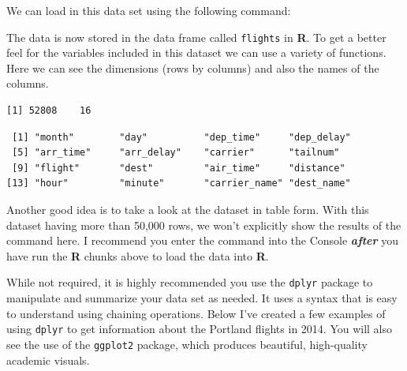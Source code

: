 \documentclass[12pt,twoside]{dukestatscithesis}
\theoremstyle{definition}
\theoremstyle{definition}
\theoremstyle{definition}
\theoremstyle{remark}
\begin{document}
We can load in this data set using the following command:
\begin{Shaded}
\begin{Highlighting}[]
\StringTok{ }\NormalTok{(}\NormalTok{)}
\end{Highlighting}
\end{Shaded}
The data is now stored in the data frame called \texttt{flights} in
\textbf{R}. To get a better feel for the variables included in this
dataset we can use a variety of functions. Here we can see the
dimensions (rows by columns) and also the names of the columns.
\begin{Shaded}
\begin{Highlighting}[]
\end{Highlighting}
\end{Shaded}
\begin{verbatim}
[1] 52808    16
\end{verbatim}
\begin{Shaded}
\begin{Highlighting}[]
\end{Highlighting}
\end{Shaded}
\begin{verbatim}
 [1] "month"        "day"          "dep_time"     "dep_delay"   
 [5] "arr_time"     "arr_delay"    "carrier"      "tailnum"     
 [9] "flight"       "dest"         "air_time"     "distance"    
[13] "hour"         "minute"       "carrier_name" "dest_name"   
\end{verbatim}
Another good idea is to take a look at the dataset in table form. With
this dataset having more than 50,000 rows, we won't explicitly show the
results of the command here. I recommend you enter the command into the
Console \textbf{\emph{after}} you have run the \textbf{R} chunks above
to load the data into \textbf{R}.
\begin{Shaded}
\begin{Highlighting}[]
\end{Highlighting}
\end{Shaded}
While not required, it is highly recommended you use the \texttt{dplyr}
package to manipulate and summarize your data set as needed. It uses a
syntax that is easy to understand using chaining operations. Below I've
created a few examples of using \texttt{dplyr} to get information about
the Portland flights in 2014. You will also see the use of the
\texttt{ggplot2} package, which produces beautiful, high-quality
academic visuals.
\end{document}
